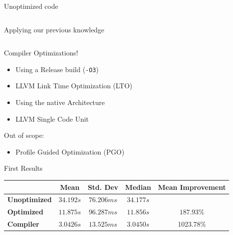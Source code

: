 \documentclass[compress,aspectratio=169]{beamer}
\begin{document}
\begin{frame}[fragile]{Unoptimized code}
  \begin{tcolorbox}[title=Unoptimized Version]
    \footnotesize\inputminted[xleftmargin=1em,linenos]{rust}{../assets/01nxn.rs}
  \end{tcolorbox}
\end{frame}

\begin{frame}[fragile]{Applying our previous knowledge}
  \begin{tcolorbox}[title=First optimized Version]
    \footnotesize\inputminted[xleftmargin=1em,linenos]{rust}{../assets/02nxn.rs}
  \end{tcolorbox}
\end{frame}

\begin{frame}{Compiler Optimizations!}
  \begin{itemize}
    \item Using a Release build (\texttt{-O3})
    \item LLVM Link Time Optimization (LTO)
    \item Using the native Architecture
    \item LLVM Single Code Unit
  \end{itemize}
  \pause
  Out of scope:
  \begin{itemize}
    \item Profile Guided Optimization (PGO)
  \end{itemize}
\end{frame}

\begin{frame}{First Results}
  \begin{table}[h]
\centering
\begin{tabular}{|l|c|c|c|c|}
\hline
  & \textbf{Mean} & \textbf{Std. Dev} & \textbf{Median} & \textbf{Mean Improvement}\\
\hline
  \textbf{Unoptimized} & $34.192s$ & $76.206ms$ & $34.177s$ & \\
  \hline
  \textbf{Optimized} & $11.875s$ & $96.287ms$ & $11.856s$ & $187.93$\%\\
  \hline
  \textbf{Compiler} &  $3.0426s$ & $13.525ms$ &  $3.0450s$ & 1023.78\%\\
\hline
\end{tabular}
\end{table}
\end{frame}
\end{document}

